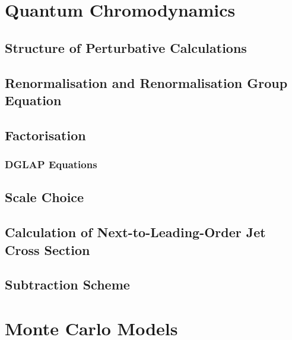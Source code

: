 \section{Quantum Chromodynamics}
\label{sec:qcd}


\subsection{Structure of Perturbative Calculations}
\label{subsec:pqcdstructure}


\subsection{Renormalisation and Renormalisation Group Equation}


\subsection{Factorisation}
\label{subsec:factorisation}


\subsubsection{DGLAP Equations}
\label{subsubsec:dglapeq}


\subsection{Scale Choice}


\subsection{Calculation of Next-to-Leading-Order Jet Cross Section}
\label{subsec:nlojetcalc}


\subsection{Subtraction Scheme}
\label{subsec:subscheme}


%

\section{Monte Carlo Models}
\label{sec:mcmodels}
